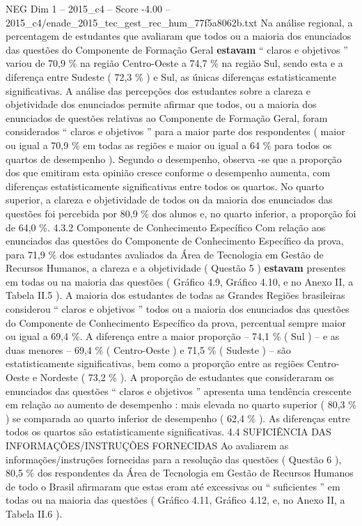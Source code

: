 \begin{textsample}{NEG Dim 1 – 2015\_c4 – Score -4.00 – 2015\_c4/enade\_2015\_tec\_gest\_rec\_hum\_77f5a8062b.txt}
Na análise regional, a percentagem de estudantes que avaliaram que todos ou a maioria dos enunciados das questões do Componente de Formação Geral \textbf{estavam} “ claros e objetivos ” variou de 70,9 \% na região Centro-Oeste a 74,7 \% na região Sul, sendo esta e a diferença entre Sudeste ( 72,3 \% ) e Sul, as únicas diferenças estatisticamente significativas.
A análise das percepções dos estudantes sobre a clareza e objetividade dos enunciados permite afirmar que todos, ou a maioria dos enunciados de questões relativas ao Componente de Formação Geral, foram considerados “ claros e objetivos ” para a maior parte dos respondentes ( maior ou igual a 70,9 \% em todas as regiões e maior ou igual a 64 \% para todos os quartos de desempenho ).
Segundo o desempenho, observa -se que a proporção dos que emitiram esta opinião cresce conforme o desempenho aumenta, com diferenças estatisticamente significativas entre todos os quartos.
No quarto superior, a clareza e objetividade de todos ou da maioria dos enunciados das questões foi percebida por 80,9 \% dos alunos e, no quarto inferior, a proporção foi de 64,0 \%. 4.3.2 Componente de Conhecimento Específico Com relação aos enunciados das questões do Componente de Conhecimento Específico da prova, para 71,9 \% dos estudantes avaliados da Área de Tecnologia em Gestão de Recursos Humanos, a clareza e a objetividade ( Questão 5 ) \textbf{estavam} presentes em todas ou na maioria das questões ( Gráfico 4.9, Gráfico 4.10, e no Anexo II, a Tabela II.5 ).
A maioria dos estudantes de todas as Grandes Regiões brasileiras considerou “ claros e objetivos ” todos ou a maioria dos enunciados das questões do Componente de Conhecimento Específico da prova, percentual sempre maior ou igual a 69,4 \%.
A diferença entre a maior proporção – 74,1 \% ( Sul ) – e as duas menores – 69,4 \% ( Centro-Oeste ) e 71,5 \% ( Sudeste ) – são estatisticamente significativas, bem como a proporção entre as regiões Centro-Oeste e Nordeste ( 73,2 \% ).
A proporção de estudantes que consideraram os enunciados das questões “ claros e objetivos ” apresenta uma tendência crescente em relação ao aumento de desempenho : mais elevada no quarto superior ( 80,3 \% ) se comparada ao quarto inferior de desempenho ( 62,4 \% ).
As diferenças entre todos os quartos são estatisticamente significativas. 4.4 SUFICIÊNCIA DAS INFORMAÇÕES/INSTRUÇÕES FORNECIDAS Ao avaliarem as informações/instruções fornecidas para a resolução das questões ( Questão 6 ), 80,5 \% dos respondentes da Área de Tecnologia em Gestão de Recursos Humanos de todo o Brasil afirmaram que estas eram até excessivas ou “ suficientes ” em todas ou na maioria das questões ( Gráfico 4.11, Gráfico 4.12, e, no Anexo II, a Tabela II.6 ).

\end{textsample}
